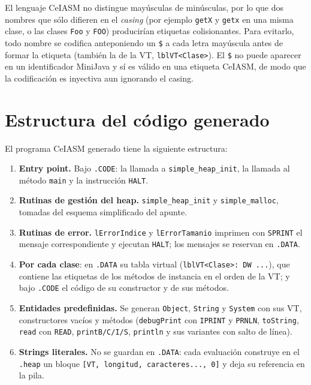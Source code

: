 \documentclass[11pt,a4paper]{article}
\begin{document}
El lenguaje CeIASM no distingue mayúsculas de minúsculas, por lo que dos nombres
que sólo difieren en el \emph{casing} (por ejemplo \texttt{getX} y \texttt{getx}
en una misma clase, o las clases \texttt{Foo} y \texttt{FOO}) producirían
etiquetas colisionantes. Para evitarlo, todo nombre se codifica anteponiendo un
\texttt{\$} a cada letra mayúscula antes de formar la etiqueta (también la de la
VT, \texttt{lblVT<Clase>}). El \texttt{\$} no puede aparecer en un identificador
MiniJava y sí es válido en una etiqueta CeIASM, de modo que la codificación es
inyectiva aun ignorando el casing.

\section{Estructura del código generado}

El programa CeIASM generado tiene la siguiente estructura:

\begin{enumerate}
  \item \textbf{Entry point.} Bajo \texttt{.CODE}: la llamada a
        \texttt{simple\_heap\_init}, la llamada al método \texttt{main} y la
        instrucción \texttt{HALT}.
  \item \textbf{Rutinas de gestión del heap.} \texttt{simple\_heap\_init} y
        \texttt{simple\_malloc}, tomadas del esquema simplificado del apunte.
  \item \textbf{Rutinas de error.} \texttt{lErrorIndice} y
        \texttt{lErrorTamanio} imprimen con \texttt{SPRINT} el mensaje
        correspondiente y ejecutan \texttt{HALT}; los mensajes se reservan en
        \texttt{.DATA}.
  \item \textbf{Por cada clase}: en \texttt{.DATA} su tabla virtual
        (\texttt{lblVT<Clase>: DW ...}), que contiene las etiquetas de los métodos
        de instancia en el orden de la VT; y bajo \texttt{.CODE} el código de su
        constructor y de sus métodos.
  \item \textbf{Entidades predefinidas.} Se generan \texttt{Object},
        \texttt{String} y \texttt{System} con sus VT, constructores vacíos y
        métodos (\texttt{debugPrint} con \texttt{IPRINT} y \texttt{PRNLN},
        \texttt{toString},
        \texttt{read} con \texttt{READ}, \texttt{printB/C/I/S},
        \texttt{println} y sus variantes con salto de línea).
  \item \textbf{Strings literales.} No se guardan en \texttt{.DATA}: cada
        evaluación construye en el \texttt{.heap} un bloque
        \texttt{[VT, longitud, caracteres..., 0]} y deja su referencia en la pila.
\end{enumerate}
\end{document}

